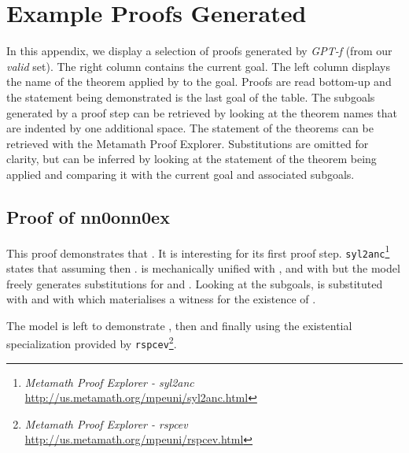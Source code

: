 \documentclass{article}
\begin{document}
\section{Example Proofs Generated}

In this appendix, we display a selection of proofs generated by \textit{GPT-f} (from our \textit{valid} set). The right column contains the current goal.  The left column displays the name of the theorem applied by to the goal. Proofs are read bottom-up and the statement being demonstrated is the last goal of the table. The subgoals generated by a proof step can be retrieved by looking at the theorem names that are indented by one additional space. The statement of the theorems can be retrieved with the Metamath Proof Explorer. Substitutions are omitted for clarity, but can be inferred by looking at the statement of the theorem being applied and comparing it with the current goal and associated subgoals.

\subsection{Proof of \textbf{nn0onn0ex}}

This proof demonstrates that . It is interesting for its first proof step. \verb|syl2anc|\footnote{\textit{Metamath Proof Explorer - syl2anc} \url{http://us.metamath.org/mpeuni/syl2anc.html}} states that assuming  then .  is mechanically unified with , and  with  but the model freely generates substitutions for  and . Looking at the subgoals,  is substituted with  and  with  which materialises a witness for the existence of .

The model is left to demonstrate , then  and finally  using the existential specialization provided by \verb|rspcev|\footnote{\textit{Metamath Proof Explorer - rspcev} \url{http://us.metamath.org/mpeuni/rspcev.html}}.
\end{document}
